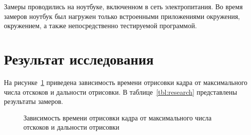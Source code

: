 Замеры проводились на ноутбуке, включенном в сеть 
электропитания. Во время замеров ноутбук был нагружен только 
встроенными приложениями окружения, окружением, а 
также непосредственно тестируемой программой.

\section{Результат исследования}

На рисунке~\ref{img:research} приведена зависимость времени отрисовки кадра от максимального числа отскоков и дальности отрисовки. В таблице~\ref{tbl:research} представлены результаты
замеров.

\begin{figure}[H]
  \centering
  
  \caption{\label{img:research}Зависимость времени отрисовки кадра от максимального числа отскоков и дальности отрисовки}
\end{figure}

